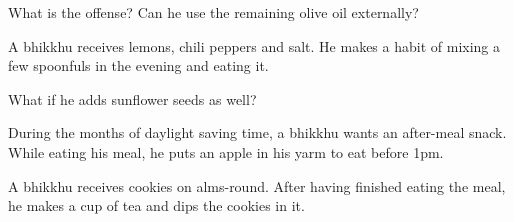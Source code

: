 What is the offense? Can he use the remaining olive oil externally?

\bigskip

A bhikkhu receives lemons, chili peppers and salt. He makes a habit of mixing a
few spoonfuls in the evening and eating it.

\bigskip

What if he adds sunflower seeds as well?

\bigskip

During the months of daylight saving time, a bhikkhu wants an after-meal snack.
While eating his meal, he puts an apple in his yarm to eat before 1pm.

\bigskip

A bhikkhu receives cookies on alms-round. After having finished eating the meal, he makes a cup of tea and
dips the cookies in it.
